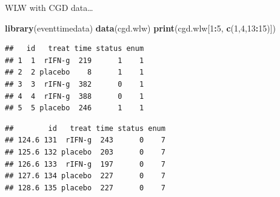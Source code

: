 \documentclass[ignorenonframetext,]{beamer}
\newenvironment{Shaded}{\begin{snugshade}}{\end{snugshade}}
\newcommand{\DecValTok}[1]{\textcolor[rgb]{0.00,0.00,0.81}{#1}}
\newcommand{\KeywordTok}[1]{\textcolor[rgb]{0.13,0.29,0.53}{\textbf{#1}}}
\newcommand{\NormalTok}[1]{#1}
\newcommand{\OperatorTok}[1]{\textcolor[rgb]{0.81,0.36,0.00}{\textbf{#1}}}
\newcommand{\StringTok}[1]{\textcolor[rgb]{0.31,0.60,0.02}{#1}}
\begin{document}
\begin{frame}[fragile]{%
\protect\hypertarget{wlw-with-cgd-data}{%
WLW with CGD data\ldots}}

\footnotesize

\begin{Shaded}
\begin{Highlighting}[]
\KeywordTok{library}\NormalTok{(eventtimedata)}
\KeywordTok{data}\NormalTok{(cgd.wlw)}
\KeywordTok{print}\NormalTok{(cgd.wlw[}\DecValTok{1}\OperatorTok{:}\DecValTok{5}\NormalTok{, }\KeywordTok{c}\NormalTok{(}\DecValTok{1}\NormalTok{,}\DecValTok{4}\NormalTok{,}\DecValTok{13}\OperatorTok{:}\DecValTok{15}\NormalTok{)])}
\end{Highlighting}
\end{Shaded}

\begin{verbatim}
##   id   treat time status enum
## 1  1  rIFN-g  219      1    1
## 2  2 placebo    8      1    1
## 3  3  rIFN-g  382      0    1
## 4  4  rIFN-g  388      0    1
## 5  5 placebo  246      1    1
\end{verbatim}

\begin{Shaded}
\end{Shaded}

\begin{verbatim}
##        id   treat time status enum
## 124.6 131  rIFN-g  243      0    7
## 125.6 132 placebo  203      0    7
## 126.6 133  rIFN-g  197      0    7
## 127.6 134 placebo  227      0    7
## 128.6 135 placebo  227      0    7
\end{verbatim}

\end{frame}
\end{document}
